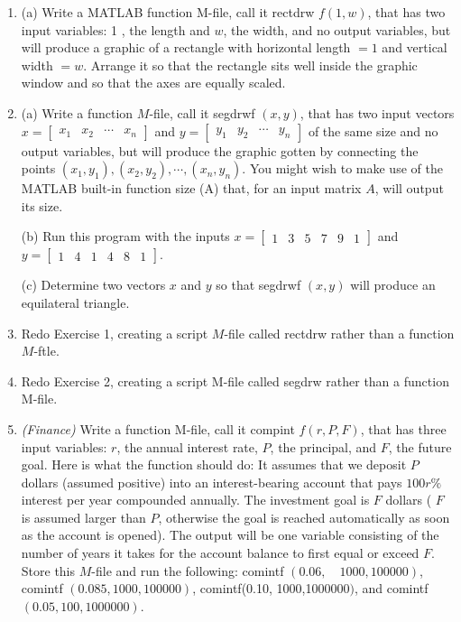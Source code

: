 \documentclass[../main.tex]{subfiles}
\begin{document}
\begin{enumerate}
\item (a) Write a MATLAB function M-file, call it rectdrw $f(1, w)$, that has two input variables: 1 , the length and $w$, the width, and no output variables, but will produce a graphic of a rectangle with horizontal length $=1$ and vertical width $=w$. Arrange it so that the rectangle sits well inside the graphic window and so that the axes are equally scaled.

\item  (a) Write a function $M$-file, call it segdrwf $(x, y)$, that has two input vectors $x=\left[\begin{array}{llll}x_{1} & x_{2} & \cdots & x_{n}\end{array}\right]$ and $y=\left[\begin{array}{llll}y_{1} & y_{2} & \cdots & y_{n}\end{array}\right]$ of the same size and no output variables, but will produce the graphic gotten by connecting the points $\left(x_{1}, y_{1}\right),\left(x_{2}, y_{2}\right), \cdots,\left(x_{n}, y_{n}\right)$. You might wish to make use of the MATLAB built-in function size (A) that, for an input matrix $A$, will output its size.

(b) Run this program with the inputs $x=\left[\begin{array}{llllll}1 & 3 & 5 & 7 & 9 & 1\end{array}\right]$ and $y=\left[\begin{array}{llllll}1 & 4 & 1 & 4 & 8 & 1\end{array}\right]$.

(c) Determine two vectors $x$ and $y$ so that segdrwf $(x, y)$ will produce an equilateral triangle.

\item Redo Exercise 1, creating a script $M$-file called rectdrw rather than a function $M$-ftle.

\item  Redo Exercise 2, creating a script M-file called segdrw rather than a function M-file.

\item  \emph{(Finance)} Write a function M-file, call it compint $f(r, P, F)$, that has three input variables: $r$, the annual interest rate, $P$, the principal, and $F$, the future goal. Here is what the function should do: It assumes that we deposit $P$ dollars (assumed positive) into an interest-bearing account that pays $100 r \%$ interest per year compounded annually. The investment goal is $F$ dollars ( $F$ is assumed larger than $P$, otherwise the goal is reached automatically as soon as the account is opened). The output will be one variable consisting of the number of years it takes for the account balance to first equal or exceed $F$. Store this $M$-file and run the following: comintf $(0.06, \quad 1000,100000)$, comintf $(0.085,1000,100000)$, comintf(0.10, 1000,1000000$)$, and comintf $(0.05,100,1000000)$.\\


\end{enumerate}
\end{document}
